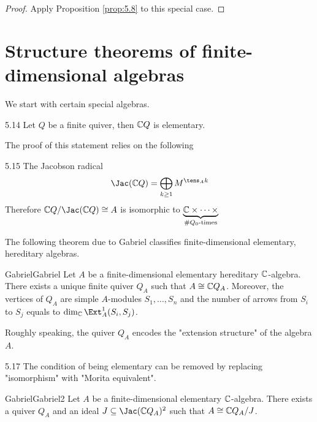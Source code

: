 \documentclass[twoside = false,	%
		headsepline,		%
		parskip = true,
		]{scrbook}						%
\begin{document}
    \begin{proof}
        Apply Proposition \ref{prop:5.8} to this special case.
    \end{proof}

\section{Structure theorems of finite-dimensional algebras}
    We start with certain special algebras.
    
    \begin{example}{}{5.14}
        Let $Q$ be a finite quiver, then $\mathbb C Q$ is elementary.
    \end{example}

    The proof of this statement relies on the following
    \begin{proposition}{}{5.15}
        The Jacobson radical
        \begin{equation*}
            \Jac(\C Q) = \bigoplus_{k \geq 1} M^{\tens_A k}
        \end{equation*}
        Therefore $\C Q/\Jac(\C Q) \cong A$ is isomorphic to $\underbrace{\mathbb C \times \dots \times}_{\# Q_0 \text{-times}}$
    \end{proposition}

    The following theorem due to Gabriel classifies finite-dimensional elementary, hereditary algebras.

    \begin{theorem}{Gabriel}{Gabriel}
        Let $A$ be a finite-dimensional elementary hereditary $\mathbb C$-algebra. There exists a unique finite quiver $Q_A$ such that $A \cong \mathbb C Q_A$. Moreover, the vertices of $Q_A$ are simple $A$-modules $S_1,\dots,S_n$ and the number of arrows from $S_i$ to $S_j$ equals to $\dim_\C \Ext_A^1(S_i,S_j)$.
    \end{theorem}

    Roughly speaking, the quiver $Q_A$ encodes the "extension structure" of the algebra $A$.

    \begin{remark}{}{5.17}
        The condition of being elementary can be removed by replacing "isomorphism" with "Morita equivalent".
    \end{remark}

    \begin{theorem}{Gabriel}{Gabriel2}
        Let $A$ be a finite-dimensional elementary $\mathbb C$-algebra. There exists a quiver $Q_A$ and an ideal $J \subseteq \Jac(\C Q_A)^2$ such that $A \cong \mathbb C Q_A /J$.
    \end{theorem}
\end{document}
